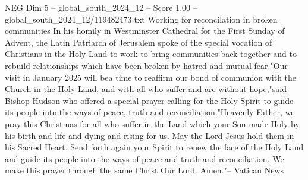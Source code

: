 \begin{textsample}{NEG Dim 5 – global\_south\_2024\_12 – Score 1.00 – global\_south\_2024\_12/119482473.txt}
Working for reconcilation in broken communities In his homily in Westminster Cathedral for the First Sunday of Advent, the Latin Patriarch of Jerusalem spoke of the special vocation of Christians in the Holy Land to work to bring communities back together and to rebuild relationships which have been broken by hatred and mutual fear."Our visit in January 2025 will bea time to reaffirm our bond of communion with the Church in the Holy Land, and with all who suffer and are without hope,"said Bishop Hudson who offered a special prayer calling for the Holy Spirit to guide its people into the ways of peace, truth and reconciliation."Heavenly Father, we pray this Christmas for all who suffer in the Land which your Son made Holy by his birth and life and dying and rising for us.
May the Lord Jesus hold them in his Sacred Heart.
Send forth again your Spirit to renew the face of the Holy Land and guide its people into the ways of peace and truth and reconciliation.
We make this prayer through the same Christ Our Lord.
Amen."-- Vatican News

\end{textsample}
